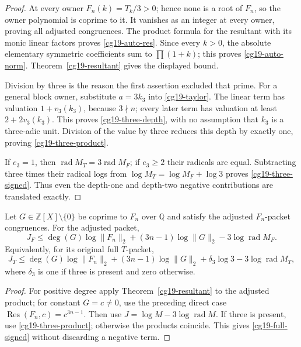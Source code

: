 \begin{proof}
At every owner \(F_n(k)=T_k/3>0\); hence none is a root of \(F_n\),
so the owner polynomial is coprime to it. It vanishes as an
integer at every owner, proving all adjusted congruences.
The product formula for the resultant with its monic linear
factors proves \eqref{cg19-auto-res}. Since every \(k>0\), the
absolute elementary symmetric coefficients sum to
\(\prod(1+k)\); this proves \eqref{cg19-auto-norm}.
Theorem~\ref{cg19-resultant} gives the displayed bound.

Division by three is the reason the first assertion excluded
that prime. For a general block owner, substitute \(a=3k_3\)
into \eqref{cg19-taylor}. The linear term has valuation
\(1+v_3(k_3)\), because \(3\nmid n\); every later term has
valuation at least \(2+2v_3(k_3)\). This proves
\eqref{cg19-three-depth}, with no assumption that \(k_3\) is a
three-adic unit. Division of the value by three reduces this
depth by exactly one, proving \eqref{cg19-three-product}.

If \(e_3=1\), then
\(\operatorname{rad}M_T=3\operatorname{rad}M_F\); if \(e_3\ge2\)
their radicals are equal. Subtracting three times their radical
logs from \(\log M_T=\log M_F+\log3\) proves
\eqref{cg19-three-signed}. Thus even the depth-one and depth-two
negative contributions are translated exactly.
\end{proof}

\begin{corollary}
\label{cg19-signed-certificate}
Let \(G\in\mathbb Z[X]\setminus\{0\}\) be coprime to \(F_n\)
over \(\mathbb Q\) and satisfy the
adjusted \(F_n\)-packet congruences. For the adjusted packet,
\[
 J_F\le
 \deg(G)\log\|F_n\|_2+(3n-1)\log\|G\|_2
       -3\log\operatorname{rad}M_F.
\]
Equivalently, for its original full \(T\)-packet,
\begin{equation}
 J_T\le
 \deg(G)\log\|F_n\|_2+(3n-1)\log\|G\|_2
       +\delta_3\log3-3\log\operatorname{rad}M_T,
 \label{cg19-full-signed}
\end{equation}
where \(\delta_3\) is one if three is present and zero otherwise.
\end{corollary}
\begin{proof}
For positive degree apply Theorem~\ref{cg19-resultant} to the
adjusted product; for constant \(G=c\ne0\), use the preceding
direct case \(\operatorname{Res}(F_n,c)=c^{3n-1}\).
Then use \(J=\log M-3\log\operatorname{rad}M\).
If three is present, use \eqref{cg19-three-product}; otherwise
the products coincide. This gives \eqref{cg19-full-signed}
without discarding a negative term.
\end{proof}

